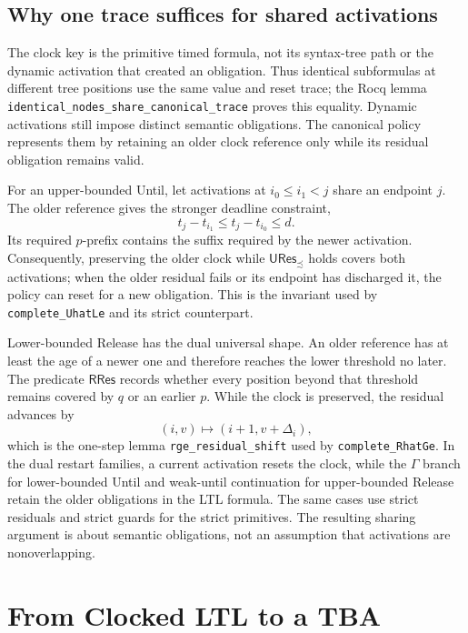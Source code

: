\documentclass[10pt,journal,compsoc]{IEEEtran}
\begin{document}
\subsection{Why one trace suffices for shared activations}
The clock key is the primitive timed formula, not its syntax-tree path or the
dynamic activation that created an obligation. Thus identical subformulas at
different tree positions use the same value and reset trace; the Rocq lemma
\texttt{identical\_\allowbreak{}nodes\_\allowbreak{}share\_\allowbreak{}canonical\_\allowbreak{}trace} proves this equality.
Dynamic activations still impose distinct semantic obligations. The canonical
policy represents them by retaining an older clock reference only while its
residual obligation remains valid.

For an upper-bounded Until, let activations at $i_0\le i_1<j$ share an
endpoint $j$. The older reference gives the stronger deadline constraint,
\[
 t_j-t_{i_1}\le t_j-t_{i_0}\le d.
\]
Its required $p$-prefix contains the suffix required by the newer activation.
Consequently, preserving the older clock while
$\mathsf{URes}_{\precsim}$ holds covers both activations; when the older
residual fails or its endpoint has discharged it, the policy can reset for a
new obligation. This is the invariant used by
\texttt{complete\_UhatLe} and its strict counterpart.

Lower-bounded Release has the dual universal shape. An older reference has at
least the age of a newer one and therefore reaches the lower threshold no
later. The predicate $\mathsf{RRes}$ records whether every position beyond
that threshold remains covered by $q$ or an earlier $p$. While the clock is
preserved, the residual advances by
\[
 (i,v)\longmapsto(i+1,v+\Delta_i),
\]
which is the one-step lemma \texttt{rge\_residual\_shift} used by
\texttt{complete\_RhatGe}. In the dual restart families, a current
activation resets the clock, while the $\Gamma$ branch for lower-bounded
Until and weak-until continuation for upper-bounded Release retain the older
obligations in the LTL formula. The same cases use strict residuals and strict
guards for the strict primitives. The resulting sharing argument is about
semantic obligations, not an assumption that activations are nonoverlapping.

\section{From Clocked LTL to a TBA}
\label{sec:tba-construction}
\end{document}

